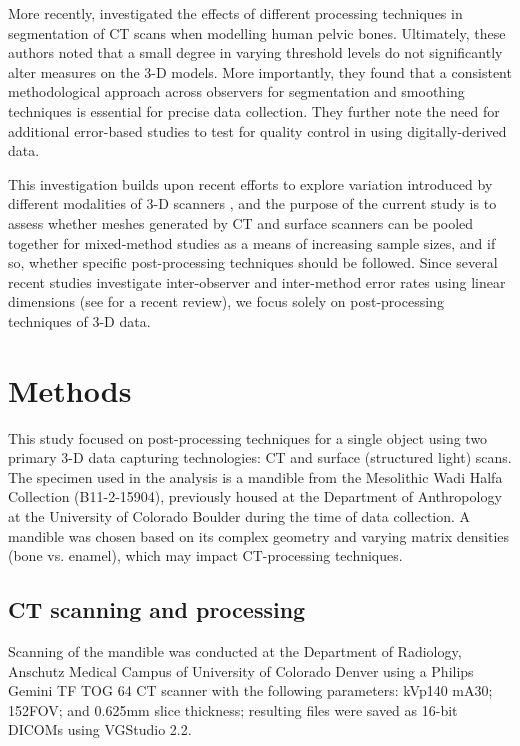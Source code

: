 \documentclass[review]{elsarticle}
\begin{document}
More recently, \citet{RN8984} investigated the effects of different processing techniques in segmentation of CT scans when modelling human pelvic bones. Ultimately, these authors noted that a small degree in varying threshold levels do not significantly alter measures on the 3-D models. More importantly, they found that a consistent methodological approach across observers for segmentation and smoothing techniques is essential for precise data collection. They further note the need for additional error-based studies to test for quality control in using digitally-derived data.

This investigation builds upon recent efforts to explore variation introduced by different modalities of 3-D scanners \citep{RN11522}, and the purpose of the current study is to assess whether meshes generated by CT and surface scanners can be pooled together for mixed-method studies as a means of increasing sample sizes, and if so, whether specific post-processing techniques should be followed. Since several recent studies investigate inter-observer and inter-method error rates using linear dimensions (see \citealt{RN11945} for a recent review), we focus solely on post-processing techniques of 3-D data. 

\section{Methods}

This study focused on post-processing techniques for a single object using two primary 3-D data capturing technologies: CT and surface (structured light) scans. The specimen used in the analysis is a mandible from the Mesolithic Wadi Halfa Collection  (B11-2-15904), previously housed at the Department of Anthropology at the University of Colorado Boulder during the time of data collection. A mandible was chosen based on its complex geometry and varying matrix densities (bone vs. enamel), which may impact CT-processing techniques.

\subsection{CT scanning and processing}

Scanning of the mandible was conducted at the Department of Radiology, Anschutz Medical Campus of University of Colorado Denver using a Philips Gemini TF TOG 64 CT scanner with the following parameters: kVp140 mA30; 152FOV; and 0.625mm slice thickness; resulting files were saved as 16-bit DICOMs using VGStudio 2.2. 
\end{document}
